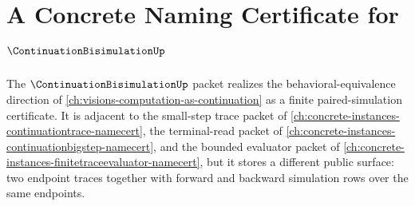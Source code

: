 \chapter{A Concrete Naming Certificate for $\ContinuationBisimulationUp$}
\label{ch:concrete-instances-continuation-bisimulation-namecert}

The $\ContinuationBisimulationUp$ packet realizes the behavioral-equivalence direction of \autoref{ch:visions-computation-as-continuation} as a finite paired-simulation certificate. It is adjacent to the small-step trace packet of \autoref{ch:concrete-instances-continuationtrace-namecert}, the terminal-read packet of \autoref{ch:concrete-instances-continuationbigstep-namecert}, and the bounded evaluator packet of \autoref{ch:concrete-instances-finitetraceevaluator-namecert}, but it stores a different public surface: two endpoint traces together with forward and backward simulation rows over the same endpoints.



